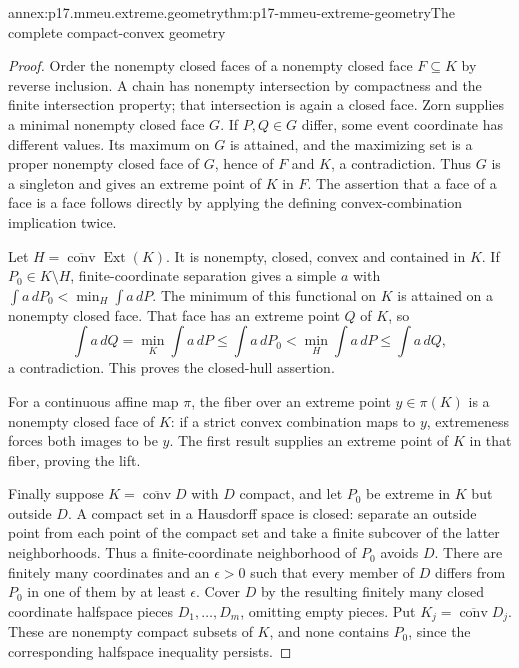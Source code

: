 \begin{annexitem}{annex:p17.mmeu.extreme.geometry}{thm:p17-mmeu-extreme-geometry}{The complete compact-convex geometry}
\begin{proof}
Order the nonempty closed faces of a nonempty
closed face \(F\subseteq K\) by reverse inclusion.
A chain has nonempty intersection by compactness
and the finite intersection property; that intersection
is again a closed face. Zorn supplies a minimal
nonempty closed face \(G\).
If \(P,Q\in G\) differ, some event coordinate
has different values. Its maximum on \(G\)
is attained, and the maximizing set is a
proper nonempty closed face of \(G\), hence
of \(F\) and \(K\), a contradiction.
Thus \(G\) is a singleton and gives an
extreme point of \(K\) in \(F\).
The assertion that a face of a face is a
face follows directly by applying the
defining convex-combination implication twice.

Let \(H=\overline{\operatorname{conv}}\operatorname{Ext}(K)\).
It is nonempty, closed, convex and contained in \(K\).
If \(P_0\in K\setminus H\), finite-coordinate
separation gives a simple \(a\) with
\(\int a\,dP_0<\min_H\int a\,dP\).
The minimum of this functional on \(K\)
is attained on a nonempty closed face.
That face has an extreme point \(Q\) of \(K\),
so
\[
 \int a\,dQ=\min_K\int a\,dP
       \leq\int a\,dP_0<\min_H\int a\,dP
       \leq\int a\,dQ,
\]
a contradiction. This proves the closed-hull assertion.

For a continuous affine map \(\pi\), the
fiber over an extreme point \(y\in\pi(K)\)
is a nonempty closed face of \(K\):
if a strict convex combination maps to \(y\),
extremeness forces both images to be \(y\).
The first result supplies an extreme point
of \(K\) in that fiber, proving the lift.

Finally suppose \(K=\overline{\operatorname{conv}}D\)
with \(D\) compact, and let \(P_0\) be
extreme in \(K\) but outside \(D\).
A compact set in a Hausdorff space is closed:
separate an outside point from each point
of the compact set and take a finite
subcover of the latter neighborhoods.
Thus a finite-coordinate neighborhood of
\(P_0\) avoids \(D\).
There are finitely many coordinates and
an \(\epsilon>0\) such that every member
of \(D\) differs from \(P_0\) in one
of them by at least \(\epsilon\).
Cover \(D\) by the resulting finitely
many closed coordinate halfspace pieces
\(D_1,\ldots,D_m\), omitting empty pieces.
Put \(K_j=\overline{\operatorname{conv}}D_j\).
These are nonempty compact subsets of \(K\),
and none contains \(P_0\), since the
corresponding halfspace inequality persists.


\end{proof}
\end{annexitem}
